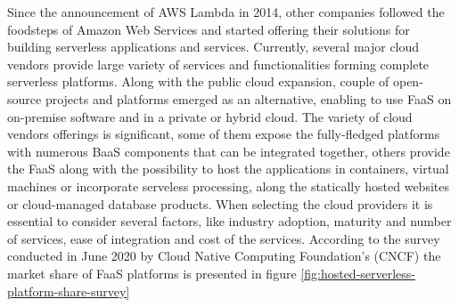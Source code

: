 Since the announcement of AWS Lambda in 2014, other companies followed the foodsteps of Amazon Web Services and started offering their solutions for building serverless applications and services. Currently, several major cloud vendors provide large variety of services and functionalities forming complete serverless platforms. Along with the public cloud expansion, couple of open-source projects and platforms emerged as an alternative, enabling to use FaaS on on-premise software and in a private or hybrid cloud. The variety of cloud vendors offerings is significant, some of them expose the fully-fledged platforms with numerous BaaS components that can be integrated together, others provide the FaaS along with the possibility to host the applications in containers, virtual machines or incorporate serveless processing, along the statically hosted websites or cloud-managed database products. When selecting the cloud providers it is essential to consider several factors, like industry adoption, maturity and number of services, ease of integration and cost of the services. According to the survey conducted in June 2020 by Cloud Native Computing Foundation's (CNCF) \cite{CNCFServerlessSurvey2020} the market share of FaaS platforms is presented in figure \ref{fig:hosted-serverless-platform-share-survey}



